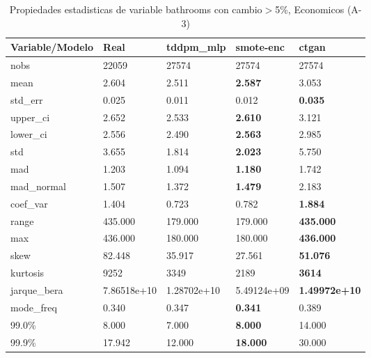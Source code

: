 \begin{table}[H]
\centering
\fontsize{8}{14}\selectfont
\caption{Propiedades estadisticas de variable bathrooms con cambio\ensuremath{>}5\%, Economicos (A-3)}
\label{table-stats-economicos-a-3-bathrooms-short}
\begin{tabular}{|l|m{10em}|m{10em}|m{10em}|m{10em}|}
\hline
 \rowcolor[gray]{0.8}
Variable/Modelo & Real & tddpm\_mlp & smote-enc & ctgan \\
\hline nobs & 22059 & 27574 & 27574 & 27574 \\
\hline mean & 2.604 & 2.511 & \bfseries 2.587 & \cellcolor[rgb]{0.9, 0.54, 0.52} 3.053 \\
\hline std\_err & 0.025 & \cellcolor[rgb]{0.9, 0.54, 0.52} 0.011 & 0.012 & \bfseries 0.035 \\
\hline upper\_ci & 2.652 & 2.533 & \bfseries 2.610 & \cellcolor[rgb]{0.9, 0.54, 0.52} 3.121 \\
\hline lower\_ci & 2.556 & 2.490 & \bfseries 2.563 & \cellcolor[rgb]{0.9, 0.54, 0.52} 2.985 \\
\hline std & 3.655 & 1.814 & \bfseries 2.023 & \cellcolor[rgb]{0.9, 0.54, 0.52} 5.750 \\
\hline mad & 1.203 & 1.094 & \bfseries 1.180 & \cellcolor[rgb]{0.9, 0.54, 0.52} 1.742 \\
\hline mad\_normal & 1.507 & 1.372 & \bfseries 1.479 & \cellcolor[rgb]{0.9, 0.54, 0.52} 2.183 \\
\hline coef\_var & 1.404 & \cellcolor[rgb]{0.9, 0.54, 0.52} 0.723 & 0.782 & \bfseries 1.884 \\
\hline range & 435.000 & \cellcolor[rgb]{0.9, 0.54, 0.52} 179.000 & \cellcolor[rgb]{0.9, 0.54, 0.52} 179.000 & \bfseries 435.000 \\
\hline max & 436.000 & \cellcolor[rgb]{0.9, 0.54, 0.52} 180.000 & \cellcolor[rgb]{0.9, 0.54, 0.52} 180.000 & \bfseries 436.000 \\
\hline skew & 82.448 & 35.917 & \cellcolor[rgb]{0.9, 0.54, 0.52} 27.561 & \bfseries 51.076 \\
\hline kurtosis & 9252 & 3349 & \cellcolor[rgb]{0.9, 0.54, 0.52} 2189 & \bfseries 3614 \\
\hline jarque\_bera & 7.86518e+10 & 1.28702e+10 & \cellcolor[rgb]{0.9, 0.54, 0.52} 5.49124e+09 & \bfseries 1.49972e+10 \\
\hline mode\_freq & 0.340 & 0.347 & \bfseries 0.341 & \cellcolor[rgb]{0.9, 0.54, 0.52} 0.389 \\
\hline 99.0\% & 8.000 & 7.000 & \bfseries 8.000 & \cellcolor[rgb]{0.9, 0.54, 0.52} 14.000 \\
\hline 99.9\% & 17.942 & 12.000 & \bfseries 18.000 & \cellcolor[rgb]{0.9, 0.54, 0.52} 30.000 \\
\hline
\end{tabular}
\end{table}
